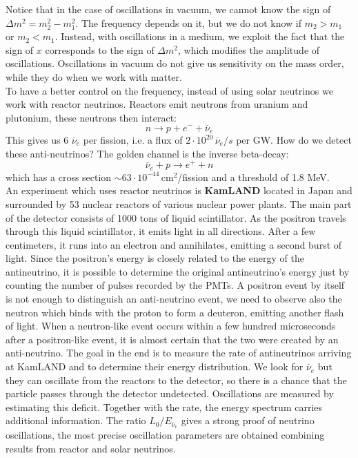 \documentclass[10.75pt,a4paper,openright,bottom=2cm]{article}
\begin{document}
Notice that in the case of oscillations in vacuum, we cannot know the sign of $\Delta m^2=m_2^2-m_1^2$. The frequency depends on it, but we do not know if $m_2>m_1$ or $m_2<m_1$. Instead, with oscillations in a medium, we exploit the fact that the sign of $x$ corresponds to the sign of $\Delta m^2$, which modifies the amplitude of oscillations. Oscillations in vacuum do not give us sensitivity on the mass order, while they do when we work with matter.\\
To have a better control on the frequency, instead of using solar neutrinos we work with reactor neutrinos. Reactors emit neutrons from uranium and plutonium, these neutrons then interact:
\[
n\to p+e^-+\overline{\nu}_e
\]
This gives us 6 $\overline{\nu}_e$ per fission, i.e. a flux of $2\cdot10^{20}\,\overline{\nu}_e/s$ per GW. How do we detect these anti-neutrinos? The golden channel is the inverse beta-decay:
\[
\overline{\nu}_e+p\to e^++n
\]
which has a cross section $\sim63\cdot10^{-44}$\,cm$^2$/fission and a threshold of 1.8 MeV.\\
An experiment which uses reactor neutrinos is \textbf{KamLAND} located in Japan and surrounded by 53 nuclear reactors of various nuclear power plants. The main part of the detector consists of 1000 tons of liquid scintillator. As the positron travels through this liquid scintillator, it emits light in all directions. After a few centimeters, it runs into an electron and annihilates, emitting a second burst of light. Since the positron's energy is closely related to the energy of the antineutrino, it is possible to determine the original antineutrino's energy just by counting the number of pulses recorded by the PMTs. A positron event by itself is not enough to distinguish an anti-neutrino event, we need to observe also the neutron which binds with the proton to form a deuteron, emitting another flash of light. When a neutron-like event occurs within a few hundred microseconds after a positron-like event, it is almost certain that the two were created by an anti-neutrino. The goal in the end is to measure the rate of antineutrinos arriving at KamLAND and to determine their energy distribution. We look for $\overline{\nu}_e$ but they can oscillate from the reactors to the detector, so there is a chance that the particle passes through the detector undetected. Oscillations are measured by estimating this deficit. Together with the rate, the energy spectrum carries additional information. The ratio $L_0/E_{\overline{\nu}_e}$ gives a strong proof of neutrino oscillations, the most precise oscillation parameters are obtained combining results from reactor and solar neutrinos.\\
\end{document}
